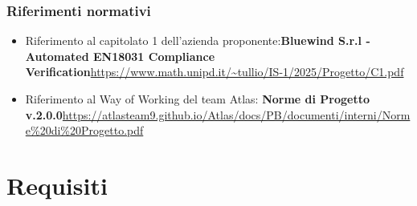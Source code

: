 \documentclass[a4paper,12pt]{article}
\begin{document}
        \subsubsection{Riferimenti normativi}
            \begin{itemize}
                \item Riferimento al capitolato 1 dell'azienda proponente:\newline \textbf{Bluewind S.r.l - Automated EN18031 Compliance Verification}\newline \url{https://www.math.unipd.it/~tullio/IS-1/2025/Progetto/C1.pdf}
                \item Riferimento al Way of Working del team Atlas: \newline \textbf{Norme di Progetto v.2.0.0}\newline \href{https://atlasteam9.github.io/Atlas/docs/PB/documenti/interni/Norme%20di%20Progetto.pdf}{https://atlasteam9.github.io/Atlas/docs/PB/documenti/interni/Norme\%20di\%20Progetto.pdf} 
            \end{itemize}

\newpage
\section{Requisiti}
\end{document}
